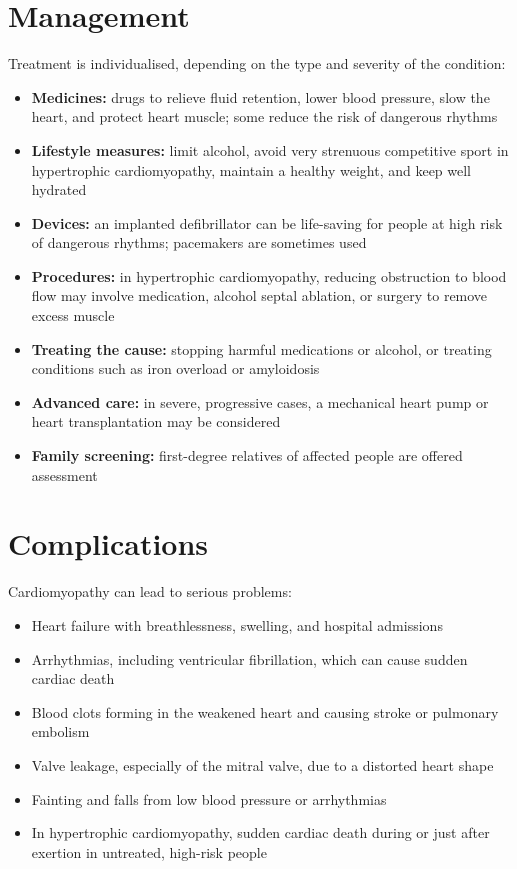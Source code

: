 \section*{Management}
Treatment is individualised, depending on the type and severity of the condition:
\begin{itemize}
    \item \textbf{Medicines:} drugs to relieve fluid retention, lower blood pressure, slow the heart, and protect heart muscle; some reduce the risk of dangerous rhythms
    \item \textbf{Lifestyle measures:} limit alcohol, avoid very strenuous competitive sport in hypertrophic cardiomyopathy, maintain a healthy weight, and keep well hydrated
    \item \textbf{Devices:} an implanted defibrillator can be life-saving for people at high risk of dangerous rhythms; pacemakers are sometimes used
    \item \textbf{Procedures:} in hypertrophic cardiomyopathy, reducing obstruction to blood flow may involve medication, alcohol septal ablation, or surgery to remove excess muscle
    \item \textbf{Treating the cause:} stopping harmful medications or alcohol, or treating conditions such as iron overload or amyloidosis
    \item \textbf{Advanced care:} in severe, progressive cases, a mechanical heart pump or heart transplantation may be considered
    \item \textbf{Family screening:} first-degree relatives of affected people are offered assessment
\end{itemize}

\section*{Complications}
Cardiomyopathy can lead to serious problems:
\begin{itemize}
    \item Heart failure with breathlessness, swelling, and hospital admissions
    \item Arrhythmias, including ventricular fibrillation, which can cause sudden cardiac death
    \item Blood clots forming in the weakened heart and causing stroke or pulmonary embolism
    \item Valve leakage, especially of the mitral valve, due to a distorted heart shape
    \item Fainting and falls from low blood pressure or arrhythmias
    \item In hypertrophic cardiomyopathy, sudden cardiac death during or just after exertion in untreated, high-risk people
\end{itemize}

